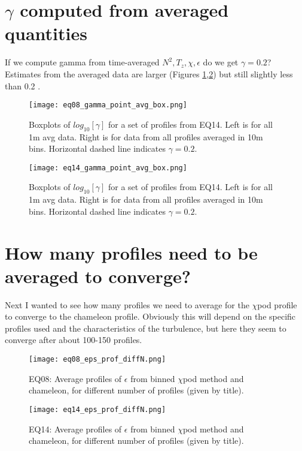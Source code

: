 \documentclass[11pt]{article}
\begin{document}
\clearpage
\section{$\gamma$ computed from averaged quantities}

If we compute gamma from time-averaged $N^2,T_z,\chi,\epsilon$ do we get $\gamma=0.2$? Estimates from the averaged data are larger (Figures \ref{gambox_eq08},\ref{gambox_eq14}) but still slightly less than 0.2 .

\begin{figure}[htbp]
\texttt{[image: eq08\_gamma\_point\_avg\_box.png]}
\caption{Boxplots of $log_{10}[\gamma]$ for a set of profiles from EQ14. Left is for all 1m avg data. Right is for data from all profiles averaged in 10m bins. Horizontal dashed line indicates $\gamma=0.2$.}
\label{gambox_eq08}
\end{figure}

\begin{figure}[htbp]
\texttt{[image: eq14\_gamma\_point\_avg\_box.png]}
\caption{Boxplots of $log_{10}[\gamma]$ for a set of profiles from EQ14. Left is for all 1m avg data. Right is for data from all profiles averaged in 10m bins. Horizontal dashed line indicates $\gamma=0.2$.}
\label{gambox_eq14}
\end{figure}


\clearpage
\section{How many profiles need to be averaged to converge?}

Next I wanted to see how many profiles we need to average for the $\chi$pod profile to converge to the chameleon profile. Obviously this will depend on the specific profiles used and the characteristics of the turbulence, but here they seem to converge after about 100-150 profiles. 

\begin{figure}[htbp]
\texttt{[image: eq08\_eps\_prof\_diffN.png]}
\caption{EQ08: Average profiles of $\epsilon$ from binned $\chi$pod method and chameleon, for different number of profiles (given by title).}
\label{}
\end{figure}

\begin{figure}[htbp]
\texttt{[image: eq14\_eps\_prof\_diffN.png]}
\caption{EQ14: Average profiles of $\epsilon$ from binned $\chi$pod method and chameleon, for different number of profiles (given by title).}
\label{}
\end{figure}
\end{document}
